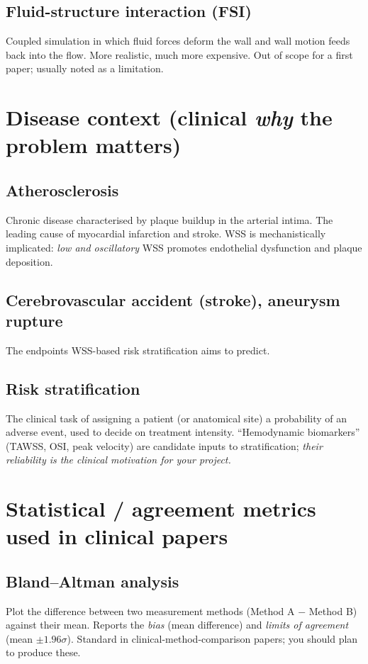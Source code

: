 \documentclass[11pt]{article}
\begin{document}
\subsection*{Fluid-structure interaction (FSI)}
Coupled simulation in which fluid forces deform the wall and wall motion feeds back into the flow. More realistic, much more expensive. Out of scope for a first paper; usually noted as a limitation.

\section{Disease context (clinical \emph{why} the problem matters)}

\subsection*{Atherosclerosis}
Chronic disease characterised by plaque buildup in the arterial intima. The leading cause of myocardial infarction and stroke. WSS is mechanistically implicated: \emph{low and oscillatory} WSS promotes endothelial dysfunction and plaque deposition.

\subsection*{Cerebrovascular accident (stroke), aneurysm rupture}
The endpoints WSS-based risk stratification aims to predict.

\subsection*{Risk stratification}
The clinical task of assigning a patient (or anatomical site) a probability of an adverse event, used to decide on treatment intensity. ``Hemodynamic biomarkers'' (TAWSS, OSI, peak velocity) are candidate inputs to stratification; \emph{their reliability is the clinical motivation for your project.}

\section{Statistical / agreement metrics used in clinical papers}

\subsection*{Bland--Altman analysis}
Plot the difference between two measurement methods (Method A $-$ Method B) against their mean. Reports the \emph{bias} (mean difference) and \emph{limits of agreement} (mean $\pm 1.96\sigma$). Standard in clinical-method-comparison papers; you should plan to produce these.
\end{document}
